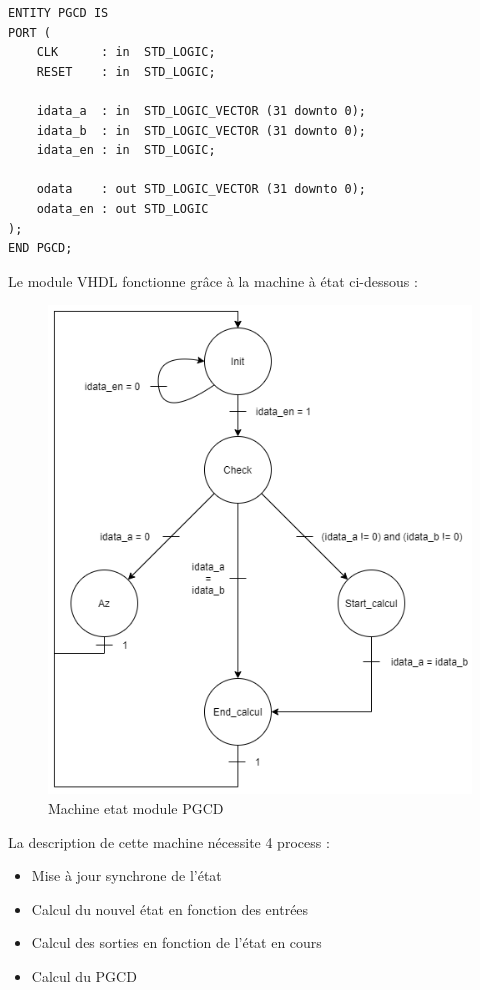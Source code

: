 \documentclass[a4paper]{article}
\begin{document}
\begin{lstlisting}[style=VHDL]
ENTITY PGCD IS
PORT ( 
    CLK      : in  STD_LOGIC;
    RESET    : in  STD_LOGIC;

    idata_a  : in  STD_LOGIC_VECTOR (31 downto 0);
    idata_b  : in  STD_LOGIC_VECTOR (31 downto 0);
    idata_en : in  STD_LOGIC;

    odata    : out STD_LOGIC_VECTOR (31 downto 0);
    odata_en : out STD_LOGIC
);
END PGCD;  
\end{lstlisting}
        Le module VHDL fonctionne grâce à la machine à état ci-dessous :
\begin{figure}[H]
    \centering
    \includegraphics[scale=0.5]{Pictures/FSM_PGCD.png}
    \caption{Machine etat module PGCD}
    \label{fig:FSM_PGCD}
\end{figure}

\newpage
        La description de cette machine nécessite 4 process :
        \begin{itemize}
            \item Mise à jour synchrone de l'état
            \item Calcul du nouvel état en fonction des entrées
            \item Calcul des sorties en fonction de l'état en cours
            \item Calcul du PGCD
        \end{itemize}
        
\end{document}
